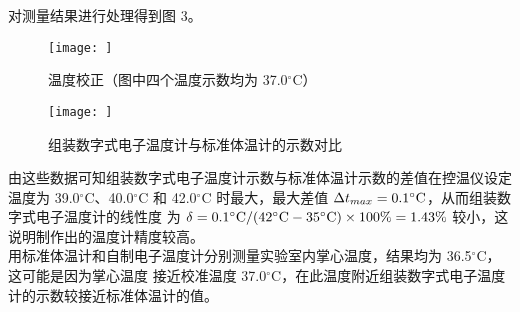 \documentclass[UTF8]{ctexart}
\begin{document}
    对测量结果进行处理得到图 3。
    \begin{figure}[H]
        \centering
        \texttt{[image: ]}
        \caption{温度校正（图中四个温度示数均为 37.0$^\circ$C）}
     \end{figure}
    \begin{figure}[H]
        \centering
        \texttt{[image: ]}
        \caption{组装数字式电子温度计与标准体温计的示数对比}
     \end{figure}
由这些数据可知组装数字式电子温度计示数与标准体温计示数的差值在控温仪设定温度为 39.0$^\circ$C、40.0$^\circ$C 和 42.0$^\circ$C
时最大，最大差值 $\Delta t_{max}= 0.1^\circ\rm{C}$，从而组装数字式电子温度计的线性度
为 $\delta =0.1^\circ\rm{C}/(42^\circ\rm{C}-35^\circ\rm{C})\times 100\%=1.43\%$ 较小，这说明制作出的温度计精度较高。~\\
\indent 用标准体温计和自制电子温度计分别测量实验室内掌心温度，结果均为 36.5$^{\circ}$C，这可能是因为掌心温度
接近校准温度 37.0$^{\circ}$C，在此温度附近组装数字式电子温度计的示数较接近标准体温计的值。
\label{unknown}
\end{document}
